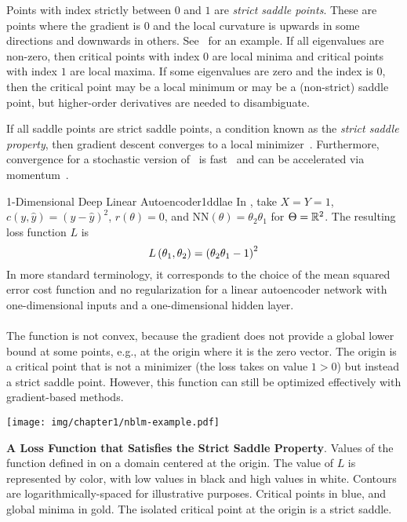 \documentclass[../../thesis.tex]{subfiles}
\begin{document}
Points with index strictly between $0$ and $1$
are \emph{strict saddle points}.
These are points where the gradient is $0$
and the local curvature is upwards in some directions
and downwards in others.
See~ for an example.
If all eigenvalues are non-zero,
then critical points with index $0$ are local minima
and critical points with index $1$ are local maxima.
If some eigenvalues are zero and the index is $0$,
then the critical point may be a local minimum
or may be a (non-strict) saddle point,
but higher-order derivatives are needed to disambiguate.

If all saddle points are strict saddle points,
a condition known as the \emph{strict saddle property},
then gradient descent converges to a local minimizer~\cite{lee2016,lee2019}.
Furthermore, convergence for a stochastic
version of~ is fast~\cite{jin2018a}
and can be accelerated via momentum~\cite{jin2018b}.

\begin{example}[float=hp]{1-Dimensional Deep Linear Autoencoder}{1ddlae}
	In , take $X = Y = 1$,
	$c(y, \hat{y}) = {\left(y - \hat{y}\right)}^2$,
	$r(\theta) = 0$,
	and
	$\mathrm{NN}(\theta) = \theta_2\theta_1$
	for $\Theta = \mathbb{R}^2$.
	The resulting loss function $L$ is
	\begin{equation}\equationlabel{nblm-example}
		L\left(\theta_1, \theta_2\right)
		= {\left(\theta_2\theta_1 - 1\right)}^2
	\end{equation}
	In more standard terminology,
	it corresponds to the choice of
	the mean squared error cost function
	and no regularization
	for a linear autoencoder network
	with one-dimensional inputs
	and a one-dimensional hidden layer.
	\\ \ \\
	The function is not convex,
	because the gradient
	does not provide a global lower bound
	at some points, e.g., at the origin
	where it is the zero vector.
	The origin is a critical point
	that is not a minimizer
	(the loss takes on value $1 > 0$)
	but instead a strict saddle point.
	However, this function can still be optimized effectively with
	gradient-based methods.

	\begin{center}
		\texttt{[image: img/chapter1/nblm-example.pdf]}
	\end{center}
	{\textbf{A Loss Function that Satisfies the Strict Saddle Property}.}%
	{Values of the function defined in 
	 on a domain centered at the origin.
	 The value of $L$ is represented by color,
	 with low values in black and high values in white.
	 Contours are logarithmically-spaced for illustrative purposes.
	 Critical points in blue, and global minima in gold.
 	 The isolated critical point at the origin is a strict saddle.}
\end{example}
\end{document}
